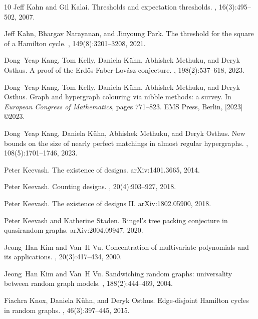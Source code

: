 \documentclass[11pt]{article}
\numberwithin{equation}{section}
\newcounter{i}
\theoremstyle{plain}
\theoremstyle{plain} %
\theoremstyle{definition}
\begin{document}
\begin{thebibliography}{10}
Jeff Kahn and Gil Kalai.
\newblock Thresholds and expectation thresholds.
, 16(3):495--502, 2007.

Jeff Kahn, Bhargav Narayanan, and Jinyoung Park.
\newblock The threshold for the square of a {H}amilton cycle.
, 149(8):3201--3208, 2021.

Dong~Yeap Kang, Tom Kelly, Daniela K\"{u}hn, Abhishek Methuku, and Deryk
  Osthus.
\newblock A proof of the {E}rd{\H{o}}s-{F}aber-{L}ov\'{a}sz conjecture.
, 198(2):537--618, 2023.

Dong~Yeap Kang, Tom Kelly, Daniela K\"{u}hn, Abhishek Methuku, and Deryk
  Osthus.
\newblock Graph and hypergraph colouring via nibble methods: a survey.
\newblock In {\em European {C}ongress of {M}athematics}, pages 771--823. EMS
  Press, Berlin, [2023] \copyright 2023.

Dong~Yeap Kang, Daniela K\"{u}hn, Abhishek Methuku, and Deryk Osthus.
\newblock New bounds on the size of nearly perfect matchings in almost regular
  hypergraphs.
, 108(5):1701--1746, 2023.

Peter Keevash.
\newblock The existence of designs.
\newblock arXiv:1401.3665, 2014.

Peter Keevash.
\newblock Counting designs.
, 20(4):903--927, 2018.

Peter Keevash.
\newblock The existence of designs {II}.
\newblock arXiv:1802.05900, 2018.

Peter Keevash and Katherine Staden.
\newblock Ringel's tree packing conjecture in quasirandom graphs.
\newblock arXiv:2004.09947, 2020.

Jeong~Han Kim and Van~H Vu.
\newblock Concentration of multivariate polynomials and its applications.
, 20(3):417--434, 2000.

Jeong~Han Kim and Van~H Vu.
\newblock Sandwiching random graphs: universality between random graph models.
, 188(2):444--469, 2004.

Fiachra Knox, Daniela K\"{u}hn, and Deryk Osthus.
\newblock Edge-disjoint {H}amilton cycles in random graphs.
, 46(3):397--445, 2015.


\end{thebibliography}
\end{document}
